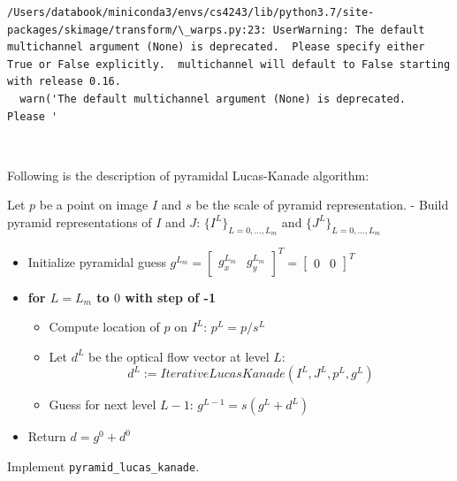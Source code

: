 \documentclass[11pt]{article}
\begin{document}
    \begin{Verbatim}[commandchars=\\\{\}]
/Users/databook/miniconda3/envs/cs4243/lib/python3.7/site-packages/skimage/transform/\_warps.py:23: UserWarning: The default multichannel argument (None) is deprecated.  Please specify either True or False explicitly.  multichannel will default to False starting with release 0.16.
  warn('The default multichannel argument (None) is deprecated.  Please '

    \end{Verbatim}

    \begin{center}
    \end{center}
    { \hspace*{\fill} \\}
    
    Following is the description of pyramidal Lucas-Kanade algorithm:

Let \(p\) be a point on image \(I\) and \(s\) be the scale of pyramid
representation. - Build pyramid representations of \(I\) and \(J\):
\(\{I^L\}_{L=0,...,L_m}\) and \(\{J^L\}_{L=0,...,L_m}\)

\begin{itemize}
\item
  Initialize pyramidal guess
  \(g^{L_m}= \begin{bmatrix}g_{x}^{L_m} & g_{y}^{L_m}\end{bmatrix}^T=\begin{bmatrix}0 & 0\end{bmatrix}^T\)
\item
  \textbf{for \(L=L_m\) to \(0\) with step of -1}

  \begin{itemize}
  \item
    Compute location of \(p\) on \(I^L\): \(p^L=p/s^L\)
  \item
    Let \(d^L\) be the optical flow vector at level \(L\): \[
    d^L := IterativeLucasKanade(I^L, J^L, p^L, g^L)
    \]
  \item
    Guess for next level \(L-1\): \(g^{L-1}=s(g^L+d^L)\)
  \end{itemize}
\item
  Return \(d=g^0+d^0\)
\end{itemize}

Implement \texttt{pyramid\_lucas\_kanade}.
\end{document}
